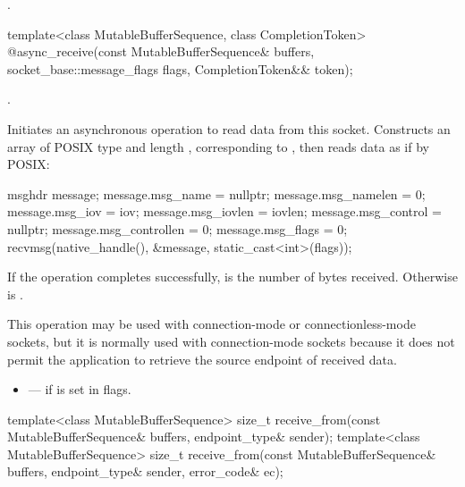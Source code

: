 \begin{itemdescr}
\pnum
\returns {}.
\end{itemdescr}

\begin{itemdecl}
template<class MutableBufferSequence, class CompletionToken>
  @\DEDUCED@ async_receive(const MutableBufferSequence& buffers,
                        socket_base::message_flags flags,
                        CompletionToken&& token);
\end{itemdecl}

\begin{itemdescr}
\pnum
\completionsig {}.

\pnum
\effects Initiates an asynchronous operation to read data from this socket. Constructs an array  of POSIX type  and length , corresponding to , then reads data as if by POSIX:
\begin{codeblock}
msghdr message;
message.msg_name = nullptr;
message.msg_namelen = 0;
message.msg_iov = iov;
message.msg_iovlen = iovlen;
message.msg_control = nullptr;
message.msg_controllen = 0;
message.msg_flags = 0;
recvmsg(native_handle(), &message, static_cast<int>(flags));
\end{codeblock}


\pnum
If the operation completes successfully,  is the number of bytes received. Otherwise  is .

\pnum
 \begin{note} This operation may be used with connection-mode or connectionless-mode sockets, but it is normally used with connection-mode sockets because it does not permit the application to retrieve the source endpoint of received data. \end{note}

\pnum
\errors
\begin{itemize}
\item
{} --- if  is set in flags.
\end{itemize}
\end{itemdescr}

\begin{itemdecl}
template<class MutableBufferSequence>
  size_t receive_from(const MutableBufferSequence& buffers,
                      endpoint_type& sender);
template<class MutableBufferSequence>
  size_t receive_from(const MutableBufferSequence& buffers,
                      endpoint_type& sender, error_code& ec);
\end{itemdecl}

